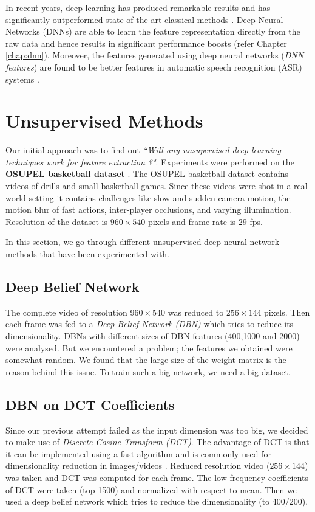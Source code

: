 In recent years, deep learning has produced remarkable results and has significantly outperformed state-of-the-art classical methods \cite{KarpathyCVPR14}.  Deep Neural Networks (DNNs) are able to learn the feature representation directly from the raw data and hence results in significant performance boosts (refer Chapter \ref{chap:dnn}).  Moreover, the features generated using deep neural networks (\textit{DNN features}) are found to be better features in automatic speech recognition (ASR) systems \cite{yu2011improved,gehring2013extracting}.

\section{Unsupervised Methods}
\label{sec:event:unsupervised}
Our initial approach was to find out \textit{``Will any unsupervised deep learning techniques work for feature extraction ?"}.  Experiments were performed on the \textbf{OSUPEL basketball dataset} \cite{brendel2011probabilistic}.  The OSUPEL basketball dataset contains videos of drills and small basketball games.  Since these videos were shot in a real-world setting it contains challenges like slow and sudden camera motion, the motion blur of fast actions, inter-player occlusions, and varying illumination.  Resolution of the dataset is $960 \times 540$ pixels and frame rate is $29$ fps.

In this section, we go through different unsupervised deep neural network methods that have been experimented with.

\subsection{Deep Belief Network} 
The complete video of resolution $960 \times 540$ was reduced to $256 \times 144$ pixels.  Then each frame was fed to a \textit{Deep Belief Network (DBN)} which tries to reduce its dimensionality.  DBNs with different sizes of DBN features (400,1000 and 2000) were analysed.  But we encountered a problem; the features we obtained were somewhat random.  We found that the large size of the weight matrix is the reason behind this issue.  To train such a big network, we need a big dataset.

\subsection{DBN on DCT Coefficients}
Since our previous attempt failed as the input dimension was too big, we decided to make use of \textit{Discrete Cosine Transform (DCT)}.  The advantage of DCT is that it can be implemented using a fast algorithm and is commonly used for dimensionality reduction in images/videos \cite{er2005high}.  Reduced resolution video ($256 \times 144$) was taken and DCT was computed for each frame.  The low-frequency coefficients of DCT were taken (top 1500) and normalized with respect to mean.  Then we used a deep belief network which tries to reduce the dimensionality (to 400/200).


